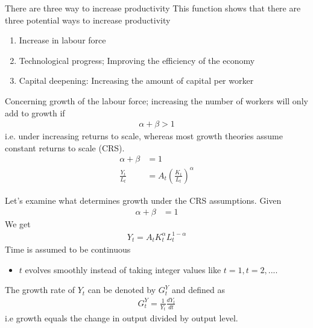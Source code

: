 \documentclass{beamer}
\begin{document}
\begin{frame}
 There are three way to increase productivity
This function shows that there are three potential ways to increase productivity
\begin{enumerate}
  \item Increase in labour force  
  \item Technological progress; Improving the efficiency of the economy
  \item Capital deepening: Increasing the amount of capital per worker  
\end{enumerate}
\end{frame}

\begin{frame}
 Concerning growth of the labour force; increasing the number of workers will only add to growth if
 \begin{align}
   \alpha+\beta>1
 \end{align}
 \medskip
 i.e. under increasing returns to scale, whereas most growth theories assume constant returns to scale (CRS).
 \begin{align}
   \alpha+\beta &= 1\\
   \frac{Y_t}{L_t} &= A_t \left(\frac{K_t}{L_t}\right)^{\alpha}
 \end{align}
\end{frame}



\begin{frame}
  Let's examine what determines growth under the CRS assumptions.
  Given   
  \begin{align}
   \alpha+\beta &= 1
  \end{align}
  We get
  \begin{align}
    Y_t=A_tK^{\alpha}_tL^{1-\alpha}_t
  \end{align}
  \medskip
  Time is assumed to be continuous
  \begin{itemize}
    \item $t$ evolves smoothly instead of taking integer values like $t=1,t=2,...$.
  \end{itemize}
  \medskip
  The growth rate of $Y_t$ can be denoted by $G^Y_t$ and defined as
  \begin{align}
    G^Y_t=\frac{1}{Y_t}\frac{dY_t}{dt}
  \end{align}
  i.e growth equals the change in output divided by output level.
\end{frame}
\end{document}
